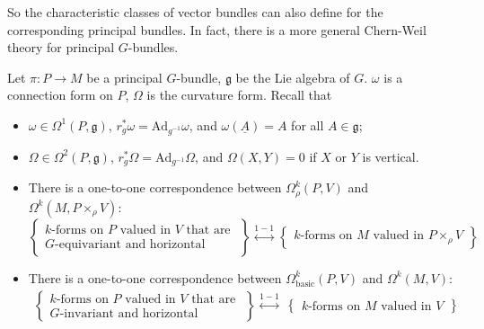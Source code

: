So the characteristic classes of vector bundles can also define for the corresponding principal bundles. 
In fact, there is a more general Chern-Weil theory for principal $G$-bundles.

Let $\pi:P\to M$ be a principal $G$-bundle, $\mathfrak{g}$ be the Lie algebra of $G$. 
$\omega$ is a connection form on $P$, $\Omega$ is the curvature form. Recall that 
\begin{itemize}[leftmargin=*]
    \item $\omega\in\Omega^1(P,\mathfrak{g})$, $r_g^*\omega = \mathrm{Ad}_{g^{-1}}\omega$, and $\omega(\underline{A}) = A$ for all $A\in\mathfrak{g}$; 
    \item $\Omega\in\Omega^2(P,\mathfrak{g})$, $r_g^*\Omega = \mathrm{Ad}_{g^{-1}}\Omega$, and $\Omega(X,Y) = 0$ if $X$ or $Y$ is vertical. 
    \item There is a one-to-one correspondence between $\Omega^k_{\rho}(P,V)$ and $\Omega^k(M,P\times_{\rho}V)$:
    \begin{equation*}
        \left\{
            \begin{array}{c}
                k\text{-forms on }P\text{ valued in }V\text{ that are } \\ 
                G\text{-equivariant and horizontal} 
            \end{array}
        \right\}
        \overset{1-1}{\longleftrightarrow}
        \left\{
            \begin{array}{c}
                k\text{-forms on }M\text{ valued in }P\times_{\rho}V
            \end{array}
        \right\}
    \end{equation*}
    \item There is a one-to-one correspondence between $\Omega^k_{\text{basic}}(P,V)$ and $\Omega^k(M,V)$:
    \begin{align*}
        \left\{
            \begin{array}{c}
                k\text{-forms on }P\text{ valued in }V\text{ that are } \\ 
                G\text{-invariant and horizontal} 
            \end{array}
        \right\}
        \overset{1-1}{\longleftrightarrow}&
        \left\{
            \begin{array}{c}
                k\text{-forms on }M\text{ valued in }V
            \end{array}
        \right\} \\ 

\end{align*}
\end{itemize}
